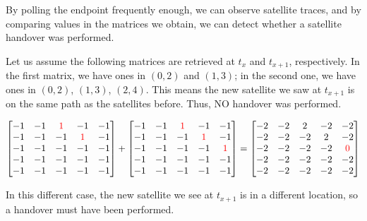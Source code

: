 \documentclass[IN,11pt,twoside,openright,idp,english]{tumthesis}
\begin{document}
By polling the endpoint frequently enough, we can observe satellite traces, and by comparing values in the matrices we
obtain, we can detect whether a satellite handover was performed.

Let us assume the following matrices are retrieved at $ t_x $ and $ t_{x+1} $, respectively. 
In the first matrix, we have ones in $ (0,2) $ and $ (1,3) $; in the second one, we have ones in $ (0,2) $, $ (1,3) $, $
(2,4) $. This means the new satellite we saw at $ t_{x+1} $ is on the same path as the satellites before. Thus, NO
handover was performed. \vspace{10mm}

$\begin{bmatrix}
-1 & -1 & \color{red}1 &           -1 & -1 \\
-1 & -1 &           -1 & \color{red}1 & -1 \\
-1 & -1 &           -1 &           -1 & -1 \\
-1 & -1 &           -1 &           -1 & -1 \\
-1 & -1 &           -1 &           -1 & -1 \\ 
\end{bmatrix}
+
\begin{bmatrix}
-1 & -1 & \color{red}1 &           -1 &           -1 \\
-1 & -1 &           -1 & \color{red}1 &           -1 \\
-1 & -1 &           -1 &           -1 & \color{red}1 \\
-1 & -1 &           -1 &           -1 &           -1 \\
-1 & -1 &           -1 &           -1 &           -1 \\
\end{bmatrix}
=
\begin{bmatrix}
-2 & -2 & 2 &  -2 &           -2 \\
-2 & -2 & -2 &  2 &           -2 \\
-2 & -2 & -2 & -2 & \color{red}0 \\
-2 & -2 & -2 & -2 &            -2 \\
-2 & -2 & -2 & -2 &            -2 \\
\end{bmatrix}$ \vspace{10mm}

In this different case, the new satellite we see at $ t_{x+1} $ is in a different location, so a handover must have been
performed. \vspace{10mm}
\end{document}
